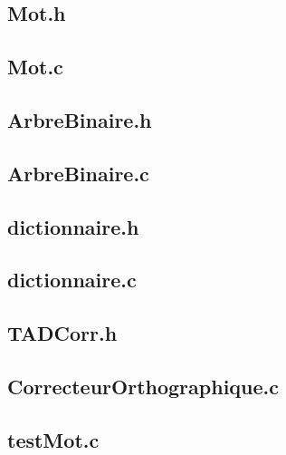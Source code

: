 

	\subsection{Mot.h}
	

	\subsection{Mot.c}
	

	\subsection{ArbreBinaire.h}
	

	\subsection{ArbreBinaire.c}
	

	\subsection{dictionnaire.h}
		
	
	\subsection{dictionnaire.c}
	
	
	\subsection{TADCorr.h}
	

	\subsection{CorrecteurOrthographique.c}
	
	
	\subsection{testMot.c}
		
		
